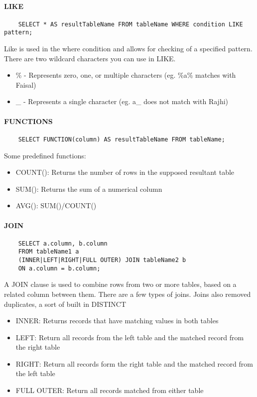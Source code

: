 \paragraph{LIKE}
\begin{verbatim}
    SELECT * AS resultTableName FROM tableName WHERE condition LIKE pattern;
\end{verbatim}
Like is used in the where condition and allows for checking of a specified pattern. There are two wildcard characters you can use in LIKE.
\begin{itemize}
	\item \% - Represents zero, one, or multiple characters (eg. \%a\% matches with Faisal)
	\item \_ - Represents a single character (eg. a\_ does not match with Rajhi)
\end{itemize}
\paragraph{FUNCTIONS}
\begin{verbatim}
    SELECT FUNCTION(column) AS resultTableName FROM tableName;
\end{verbatim}
Some predefined functions:
\begin{itemize}
	\item COUNT(): Returns the number of rows in the supposed resultant table
	\item SUM(): Returns the sum of a numerical column
	\item AVG(): SUM()/COUNT()
\end{itemize}
\paragraph{JOIN}
\begin{verbatim}
    SELECT a.column, b.column 
    FROM tableName1 a 
    (INNER|LEFT|RIGHT|FULL OUTER) JOIN tableName2 b 
    ON a.column = b.column;
\end{verbatim}
A JOIN clause is used to combine rows from two or more tables, based on a related column between them. There are a few types of joins. Joins also removed duplicates, a sort of built in DISTINCT
\begin{itemize}
	\item INNER: Returns records that have matching values in both tables
	\item LEFT: Return all records from the left table and the matched record from the right table
	\item RIGHT: Return all records form the right table and the matched record from the left table
	\item FULL OUTER: Return all records matched from either table
\end{itemize}
